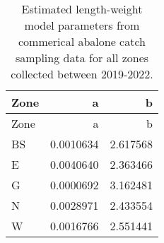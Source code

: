 \documentclass[
  11pt,
]{article}
\begin{document}
\begin{longtable}[]{@{}lrr@{}}
\caption{Estimated length-weight model parameters from commerical
abalone catch sampling data for all zones collected between
2019-2022.}\tabularnewline
\toprule\noalign{}
Zone & a & b \\
\midrule\noalign{}
\endfirsthead
\toprule\noalign{}
Zone & a & b \\
\midrule\noalign{}
\endhead
\bottomrule\noalign{}
\endlastfoot
BS & 0.0010634 & 2.617568 \\
E & 0.0040640 & 2.363466 \\
G & 0.0000692 & 3.162481 \\
N & 0.0028971 & 2.433554 \\
W & 0.0016766 & 2.551441 \\
\end{longtable}
\end{document}
